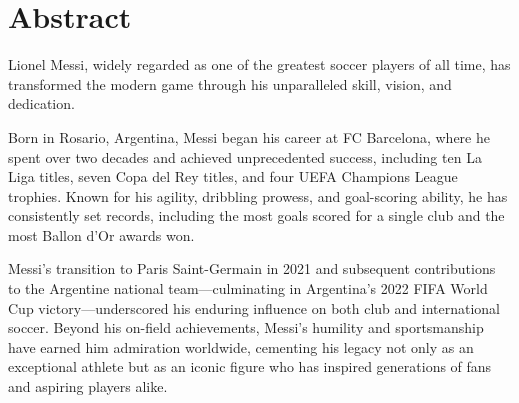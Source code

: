 \chapter*{Abstract}

Lionel Messi, widely regarded as one of the greatest soccer players of all time, has transformed the modern game through his unparalleled skill, vision, and dedication.

Born in Rosario, Argentina, Messi began his career at FC Barcelona, where he spent over two decades and achieved unprecedented success, including ten La Liga titles, seven Copa del Rey titles, and four UEFA Champions League trophies.
Known for his agility, dribbling prowess, and goal-scoring ability, he has consistently set records, including the most goals scored for a single club and the most Ballon d'Or awards won.

Messi's transition to Paris Saint-Germain in 2021 and subsequent contributions to the Argentine national team---culminating in Argentina's 2022 FIFA World Cup victory---underscored his enduring influence on both club and international soccer.
Beyond his on-field achievements, Messi's humility and sportsmanship have earned him admiration worldwide, cementing his legacy not only as an exceptional athlete but as an iconic figure who has inspired generations of fans and aspiring players alike.
